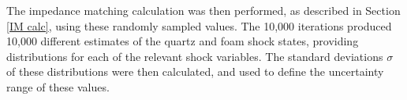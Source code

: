 The impedance matching calculation was then performed, as described in Section \ref{IM calc}, using these randomly sampled values. The 10,000 iterations produced 10,000 different estimates of the quartz and foam shock states, providing distributions for each of the relevant shock variables. The standard deviations $\sigma$ of these distributions were then calculated, and used to define the uncertainty range of these values.






